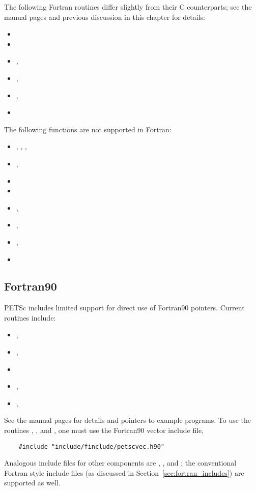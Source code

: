 The following Fortran routines differ slightly from their C counterparts; see the 
manual pages and previous discussion in this chapter for details:
\begin{itemize}
\item {}
\item {}
\item {}, 
\item {}, 
\item {}, 
\item {}
\end{itemize}
The following functions are not supported in Fortran:
\begin{itemize}
\item {}, , , 
\item {}, 
\item {}
\item {}
\item {}, 
\item {}, 
\item {}, 
\item {}
\end{itemize}

\subsection{Fortran90}

PETSc includes limited support for direct use of Fortran90 pointers.
Current routines include:
\begin{itemize}
\item {}, 
\item {}, 
\item {}
\item {}, 
\item {}, 
\end{itemize}
See the manual pages for details and pointers to example programs.  To
use the routines , 
, and , one must
use the Fortran90 vector include file,
\begin{verbatim}
    #include "include/finclude/petscvec.h90"
\end{verbatim}
Analogous include files for other components are ,
, and ; the conventional Fortran style
include files (as discussed in Section~\ref{sec:fortran_includes})
are supported as well.

